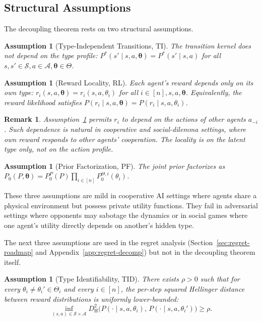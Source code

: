 \documentclass{article}
\newtheorem{assumption}[theorem]{Assumption}
\newtheorem{remark}[theorem]{Remark}
\begin{document}
\subsection{Structural Assumptions}

The decoupling theorem rests on two structural assumptions.

\begin{assumption}[Type-Independent Transitions, TI]
\label{ass:TI}
The transition kernel does not depend on the type profile: $P^*(s' \mid s, a, \boldsymbol{\theta}) = P^*(s' \mid s, a)$ for all $s, s' \in \mathcal{S}, a \in \mathcal{A}, \boldsymbol{\theta} \in \Theta$.
\end{assumption}

\begin{assumption}[Reward Locality, RL]
\label{ass:RL}
Each agent's reward depends only on its own type: $r_i(s, a, \boldsymbol{\theta}) = r_i(s, a, \theta_i)$ for all $i \in [n], s, a, \boldsymbol{\theta}$. Equivalently, the reward likelihood satisfies $P(r_i \mid s, a, \boldsymbol{\theta}) = P(r_i \mid s, a, \theta_i)$.
\end{assumption}

\begin{remark}
Assumption~\ref{ass:RL} permits $r_i$ to depend on the actions of other agents $a_{-i}$. Such dependence is natural in cooperative and social-dilemma settings, where own reward responds to other agents' cooperation. The locality is on the latent type only, not on the action profile.
\end{remark}

\begin{assumption}[Prior Factorization, PF]
\label{ass:PF}
The joint prior factorizes as $P_0(P, \boldsymbol{\theta}) = P_0^P(P) \prod_{i \in [n]} P_0^{\Theta,i}(\theta_i)$.
\end{assumption}

These three assumptions are mild in cooperative AI settings where agents share a physical environment but possess private utility functions. They fail in adversarial settings where opponents may sabotage the dynamics or in social games where one agent's utility directly depends on another's hidden type.

The next three assumptions are used in the regret analysis (Section~\ref{sec:regret-roadmap} and Appendix~\ref{app:regret-decomp}) but not in the decoupling theorem itself.

\begin{assumption}[Type Identifiability, TID]
\label{ass:TID}
There exists $\rho > 0$ such that for every $\theta_i \neq \theta_i' \in \Theta_i$ and every $i \in [n]$, the per-step squared Hellinger distance between reward distributions is uniformly lower-bounded:
\begin{equation}
\inf_{(s,a) \in \mathcal{S} \times \mathcal{A}} D_{\mathrm{H}}^2\big(P(\cdot \mid s, a, \theta_i),\, P(\cdot \mid s, a, \theta_i')\big) \geq \rho.
\end{equation}
\end{assumption}
\end{document}
